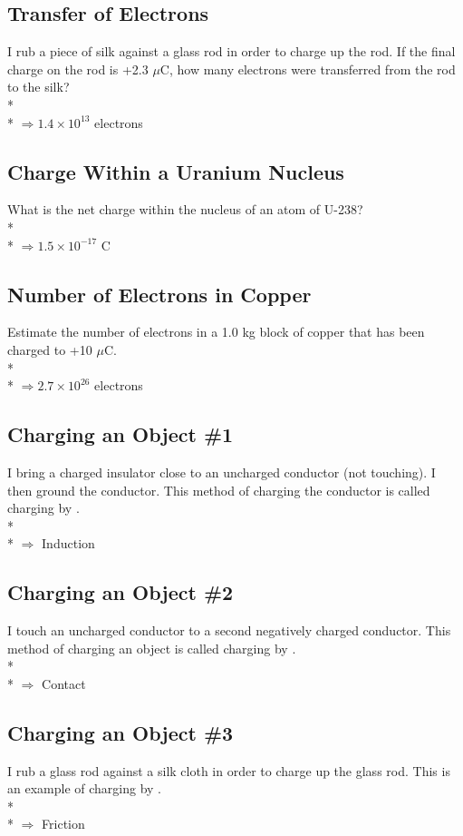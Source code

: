 \documentclass[11pt]{article}
\begin{document}
\subsection{Transfer of Electrons}
I rub a piece of silk against a glass rod in order to charge up the rod.  If the final charge on the rod is +2.3 $\mu$C, how many electrons were transferred from the rod to the silk? \\* \\*
$\Rightarrow 1.4 \times 10^{13}$ electrons

\subsection{Charge Within a Uranium Nucleus}
What is the net charge within the nucleus of an atom of U-238? \\* \\*
$\Rightarrow 1.5 \times 10^{-17}$ C

\subsection{Number of Electrons in Copper}
Estimate the number of electrons in a 1.0 kg block of copper that has been charged to +10 $\mu$C. \\* \\*
$\Rightarrow 2.7 \times 10^{26}$ electrons

\subsection{Charging an Object \#1}
I bring a charged insulator close to an uncharged conductor (not touching).  I then ground the conductor.  This method of charging the conductor is called charging by \underline{\hspace{1cm}}. \\* \\*
$\Rightarrow$ Induction

\subsection{Charging an Object \#2}
I touch an uncharged conductor to a second negatively charged conductor.  This method of charging an object is called charging by \underline{\hspace{1cm}}. \\* \\*
$\Rightarrow$ Contact

\subsection{Charging an Object \#3}
I rub a glass rod against a silk cloth in order to charge up the glass rod.  This is an example of charging by \underline{\hspace{1cm}}. \\* \\*
$\Rightarrow$ Friction
\end{document}

